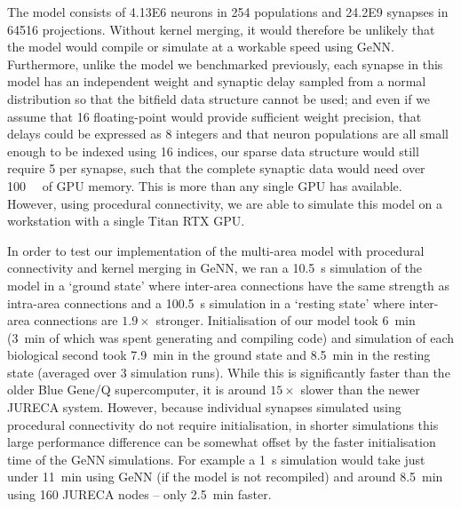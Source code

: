 \documentclass[9pt,a4paper]{amsart}
\begin{document}
The model consists of \num{4.13E6} neurons in \num{254} populations and \num{24.2E9} synapses in \num{64516} projections.
Without kernel merging, it would therefore be unlikely that the model would compile or simulate at a workable speed using GeNN.
Furthermore, unlike the model we benchmarked previously, each synapse in this model has an independent weight and synaptic delay sampled from a normal distribution so that the bitfield data structure cannot be used; and
even if we assume that \SI{16}{\bit} floating-point would provide sufficient weight precision, that delays could be expressed as \SI{8}{\bit} integers and that neuron populations are all small enough to be indexed using \SI{16}{\bit} indices, our sparse data structure would still require \SI{5}{\byte} per synapse, such that the complete synaptic data would need over \SI{100}{\giga\byte} of GPU memory.
This is more than any single GPU has available.
However, using procedural connectivity, we are able to simulate this model on a workstation with a single Titan RTX GPU.

In order to test our implementation of the multi-area model with procedural connectivity and kernel merging in GeNN, we ran a \SI{10.5}{\second} simulation of the model in a `ground state' where inter-area connections have the same strength as intra-area connections and a \SI{100.5}{\second} simulation in a `resting state' where inter-area connections are $1.9\times$ stronger.
Initialisation of our model took \SI{6}{\minute} (\SI{3}{\minute} of which was spent generating and compiling code) and simulation of each biological second took \SI{7.9}{\minute} in the ground state and \SI{8.5}{\minute} in the resting state (averaged over 3 simulation runs).
While this is significantly faster than the older Blue Gene/Q supercomputer, it is around $15\times$ slower than the newer JURECA system.
However, because individual synapses simulated using procedural connectivity do not require initialisation, in shorter simulations this large performance difference can be somewhat offset by the faster initialisation time of the GeNN simulations.
For example a \SI{1}{\second} simulation would take just under \SI{11}{\minute} using GeNN (if the model is not recompiled) and around \SI{8.5}{\minute} using \num{160} JURECA nodes -- only \SI{2.5}{\minute} faster.
\end{document}
